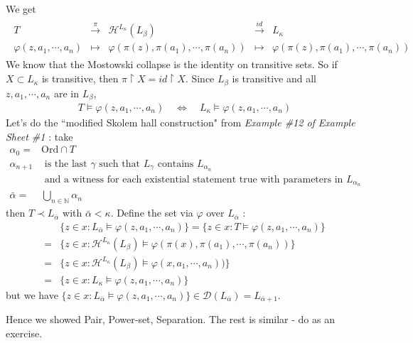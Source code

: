 \documentclass[12pt,a4paper]{article}
\newenvironment{proof}
{\begin{changemargin}{0.5cm}{0.5cm} 
	}%
	{\end{changemargin}
}
\newenvironment{p}
{\begin{proof} 
	}%
	{\end{proof}
}
\begin{document}
\begin{p}
We get
\begin{align*}
\begin{array}{ccccc}
T & \xrightarrow{\pi} & \mathcal{H}^{L_{\kappa}}(L_{\beta}) & \xrightarrow{id} & L_{\kappa} \\
\varphi(z, a_1, \cdots, a_n) & \mapsto & \varphi(\pi(z), \pi(a_1), \cdots, \pi(a_n)) & \mapsto & \varphi(\pi(z), \pi(a_1), \cdots, \pi(a_n))
\end{array}
\end{align*}
We know that the Mostowski collapse is the identity on transitive sets. So if $X\subset L_{\kappa}$ is transitive, then $\pi \upharpoonright X = id \upharpoonright X$. Since $L_{\beta}$ is transitive and all $z, a_1, \cdots, a_n$ are in $L_{\beta}$,
\begin{align*}
T\models \varphi(z, a_1, \cdots, a_n) \quad \Leftrightarrow \quad L_{\kappa} \models \varphi(z, a_1, \cdots, a_n)
\end{align*}
Let's do the ``modified Skolem hall construction" from \emph{Example \#12 of Example Sheet \#1} : take
\begin{align*}
\alpha_0 =& \text{Ord} \cap T\\
\alpha_{n+1} &\text{ is the last } \gamma \text{ such that } L_{\gamma} \text{ contains } L_{\alpha_n} \\
&\text{ and a witness for each existential statement true with parameters in } L_{\alpha_n} \\
\bar{\alpha} =& \bigcup_{n\in \mathbb{N}}\alpha_n
\end{align*} 
then $T\prec L_{\bar{\alpha}}$ with $\bar{\alpha} < \kappa$. Define the set via $\varphi$ over $L_{\bar{\alpha}}$ :
\begin{align*}
& \{z\in x: L_{\bar{\alpha}} \models \varphi(z, a_1, \cdots, a_n) \} = \{z\in x : T\models \varphi(z, a_1, \cdots, a_n) \} \\
=& \Big\{ z\in x : \mathcal{H}^{L_{\kappa}} (L_{\beta}) \models \varphi(\pi(x), \pi(a_1), \cdots, \pi(a_n)) \Big\} \\
=& \{ z\in x : \mathcal{H}^{L_{\kappa}}(L_{\beta}) \models \varphi(x, a_1, \cdots, a_n))\} \\
=& \{z\in x: L_{\kappa} \models \varphi(z, a_1, \cdots, a_n) \} 
\end{align*}
but we have $\{z\in x: L_{\bar{\alpha}} \models \varphi(z, a_1, \cdots, a_n) \} \in \mathscr{D}(L_{\bar{\alpha}}) = L_{\bar{\alpha}+1}$.

\quad Hence we showed Pair, Power-set, Separation. The rest is similar - do as an exercise.

\eop
\end{p}
\s
\end{document}
